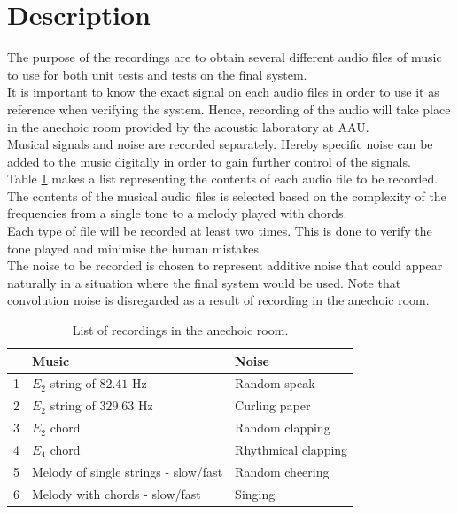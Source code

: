 \section{Description}  
The purpose of the recordings are to obtain several different audio files of music to use for both unit tests and tests on the final system. \\
It is important to know the exact signal on each audio files in order to use it as reference when verifying the system. Hence, recording of the audio will take place in the anechoic room provided by the acoustic laboratory at AAU. \\
Musical signals and noise are recorded separately. Hereby specific noise can be added to the music digitally in order to gain further control of the signals. \\
Table \ref{tab:audio} makes a list representing the contents of each audio file to be recorded. The contents of the musical audio files is selected based on the complexity of the frequencies from a single tone to a melody played with chords. \\
Each type of file will be recorded at least two times. This is done to verify the tone played and minimise the human mistakes.    \\
The noise to be recorded is chosen to represent additive noise that could appear naturally in a situation where the final system would be used. Note that convolution noise is disregarded as a result of recording in the anechoic room.

\begin{table}[H]
\centering
\begin{tabular}{l|l|l}
\hline
  & \textbf{Music}                      & \textbf{Noise}     \\ \hline
1 & $E_2$ string of $82.41$ Hz			& Random speak       \\ \hline
2 & $E_2$ string of $329.63$ Hz			& Curling paper      \\ \hline
3 & $E_2$ chord                         & Random clapping    \\ \hline
4 & $E_4$ chord                 		& Rhythmical clapping \\ \hline
5 & Melody of single strings - slow/fast & Random cheering    \\ \hline
6 & Melody with chords - slow/fast      & Singing            \\ \hline
\end{tabular}
\caption{List of recordings in the anechoic room.}
\label{tab:audio}
\end{table}

